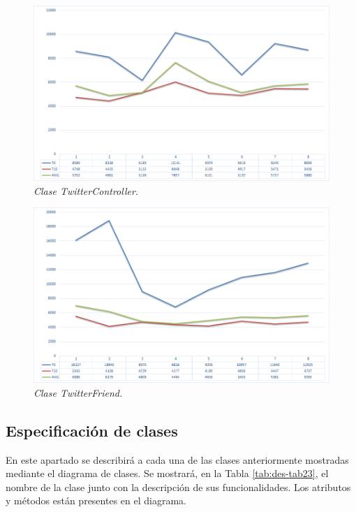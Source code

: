 \begin{figure}[H]
	\centering
	\includegraphics[scale=.4]{images/Figura5-12}
	\caption{\em Clase TwitterController.}
	\label{fig:des-im12}
\end{figure}

\begin{figure}[H]
	\centering
	\includegraphics[scale=.4]{images/Figura5-13}
	\caption{\em Clase TwitterFriend.}
	\label{fig:des-im13}
\end{figure}

\subsection{Especificación de clases}

En este apartado se describirá a cada una de las clases anteriormente mostradas mediante el diagrama de clases. Se mostrará, en la Tabla \ref{tab:des-tab23}, el nombre de la clase junto con la descripción de sus funcionalidades. Los atributos y métodos están presentes en el diagrama.

